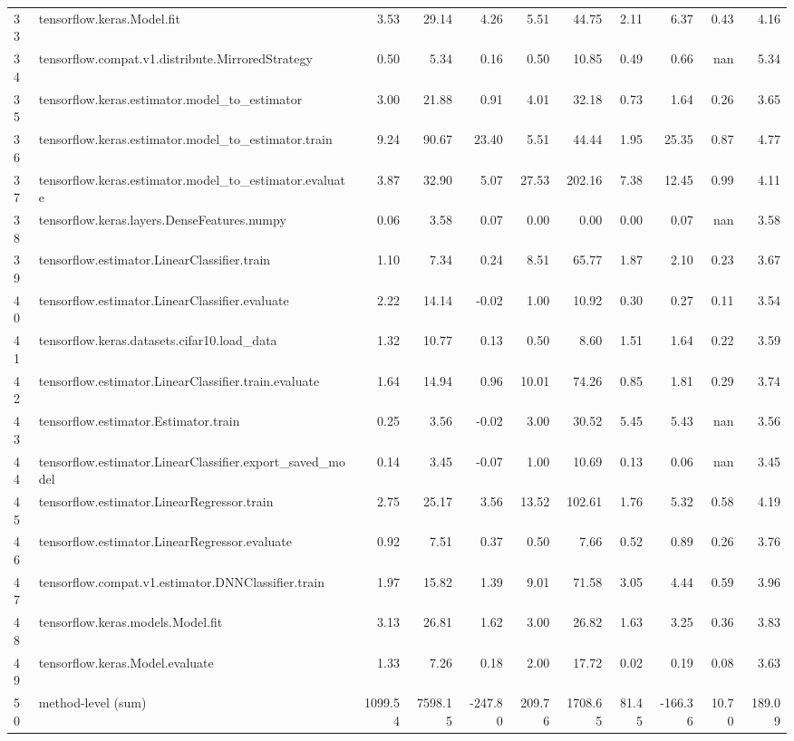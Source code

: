 \begin{tabular}{llrrrrrrrrr}
33 & tensorflow.keras.Model.fit & 3.53 & 29.14 & 4.26 & 5.51 & 44.75 & 2.11 & 6.37 & 0.43 & 4.16 \\
34 & tensorflow.compat.v1.distribute.MirroredStrategy & 0.50 & 5.34 & 0.16 & 0.50 & 10.85 & 0.49 & 0.66 & nan & 5.34 \\
35 & tensorflow.keras.estimator.model_to_estimator & 3.00 & 21.88 & 0.91 & 4.01 & 32.18 & 0.73 & 1.64 & 0.26 & 3.65 \\
36 & tensorflow.keras.estimator.model_to_estimator.train & 9.24 & 90.67 & 23.40 & 5.51 & 44.44 & 1.95 & 25.35 & 0.87 & 4.77 \\
37 & tensorflow.keras.estimator.model_to_estimator.evaluate & 3.87 & 32.90 & 5.07 & 27.53 & 202.16 & 7.38 & 12.45 & 0.99 & 4.11 \\
38 & tensorflow.keras.layers.DenseFeatures.numpy & 0.06 & 3.58 & 0.07 & 0.00 & 0.00 & 0.00 & 0.07 & nan & 3.58 \\
39 & tensorflow.estimator.LinearClassifier.train & 1.10 & 7.34 & 0.24 & 8.51 & 65.77 & 1.87 & 2.10 & 0.23 & 3.67 \\
40 & tensorflow.estimator.LinearClassifier.evaluate & 2.22 & 14.14 & -0.02 & 1.00 & 10.92 & 0.30 & 0.27 & 0.11 & 3.54 \\
41 & tensorflow.keras.datasets.cifar10.load_data & 1.32 & 10.77 & 0.13 & 0.50 & 8.60 & 1.51 & 1.64 & 0.22 & 3.59 \\
42 & tensorflow.estimator.LinearClassifier.train.evaluate & 1.64 & 14.94 & 0.96 & 10.01 & 74.26 & 0.85 & 1.81 & 0.29 & 3.74 \\
43 & tensorflow.estimator.Estimator.train & 0.25 & 3.56 & -0.02 & 3.00 & 30.52 & 5.45 & 5.43 & nan & 3.56 \\
44 & tensorflow.estimator.LinearClassifier.export_saved_model & 0.14 & 3.45 & -0.07 & 1.00 & 10.69 & 0.13 & 0.06 & nan & 3.45 \\
45 & tensorflow.estimator.LinearRegressor.train & 2.75 & 25.17 & 3.56 & 13.52 & 102.61 & 1.76 & 5.32 & 0.58 & 4.19 \\
46 & tensorflow.estimator.LinearRegressor.evaluate & 0.92 & 7.51 & 0.37 & 0.50 & 7.66 & 0.52 & 0.89 & 0.26 & 3.76 \\
47 & tensorflow.compat.v1.estimator.DNNClassifier.train & 1.97 & 15.82 & 1.39 & 9.01 & 71.58 & 3.05 & 4.44 & 0.59 & 3.96 \\
48 & tensorflow.keras.models.Model.fit & 3.13 & 26.81 & 1.62 & 3.00 & 26.82 & 1.63 & 3.25 & 0.36 & 3.83 \\
49 & tensorflow.keras.Model.evaluate & 1.33 & 7.26 & 0.18 & 2.00 & 17.72 & 0.02 & 0.19 & 0.08 & 3.63 \\
50 & method-level (sum) & 1099.54 & 7598.15 & -247.80 & 209.76 & 1708.65 & 81.45 & -166.36 & 10.70 & 189.09 \\
\end{tabular}
